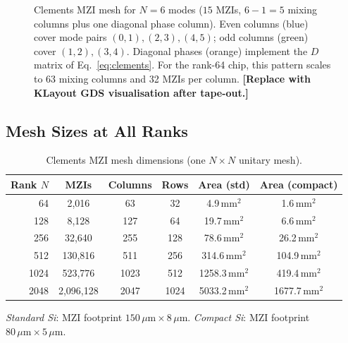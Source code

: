 \documentclass[12pt, a4paper]{article}
\begin{document}
\begin{figure}[H]
\caption{%
  Clements MZI mesh for $N=6$ modes ($15$ MZIs, $6-1=5$ mixing columns plus
  one diagonal phase column).
  Even columns (blue) cover mode pairs $(0,1),(2,3),(4,5)$;
  odd columns (green) cover $(1,2),(3,4)$.
  Diagonal phases (orange) implement the $D$ matrix of
  Eq.~\eqref{eq:clements}.
  For the rank-64 chip, this pattern scales to 63 mixing columns and 32 MZIs per
  column.
  \textbf{[Replace with KLayout GDS visualisation after tape-out.]}%
}
\label{fig:clements_mesh}
\end{figure}

\subsection{Mesh Sizes at All Ranks}

\begin{table}[H]
\centering
\caption{Clements MZI mesh dimensions (one $N\times N$ unitary mesh).}
\label{tab:mesh_sizes}
\begin{tabular}{rccccc}
\toprule
\textbf{Rank $N$} & \textbf{MZIs} & \textbf{Columns} & \textbf{Rows} &
\textbf{Area (std)} & \textbf{Area (compact)} \\
\midrule
    64 &        2,016 &  63 &  32 &    4.9\,mm$^2$ &    1.6\,mm$^2$ \\
   128 &        8,128 & 127 &  64 &   19.7\,mm$^2$ &    6.6\,mm$^2$ \\
   256 &       32,640 & 255 & 128 &   78.6\,mm$^2$ &   26.2\,mm$^2$ \\
   512 &      130,816 & 511 & 256 &  314.6\,mm$^2$ &  104.9\,mm$^2$ \\
  1024 &      523,776 &1023 & 512 & 1258.3\,mm$^2$ &  419.4\,mm$^2$ \\
  2048 &    2,096,128 &2047 &1024 & 5033.2\,mm$^2$ & 1677.7\,mm$^2$ \\
\bottomrule
\end{tabular}
\end{table}
\noindent
\textit{Standard Si}: MZI footprint $150\,\mu\text{m} \times 8\,\mu\text{m}$.
\textit{Compact Si}: MZI footprint $80\,\mu\text{m} \times 5\,\mu\text{m}$.
\end{document}
